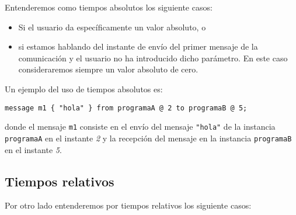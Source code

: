 Entenderemos como tiempos absolutos los siguiente casos:
\begin{itemize}
\item Si el usuario da específicamente un valor absoluto, o
\item si estamos hablando del instante de envío del primer mensaje de
  la comunicación y el usuario no ha introducido dicho parámetro. En
  este caso consideraremos siempre un valor absoluto de cero.
\end{itemize}

Un ejemplo del uso de tiempos absolutos es:

\begin{lstlisting}
message m1 { "hola" } from programaA @ 2 to programaB @ 5;
\end{lstlisting}

donde el mensaje \lstinline{m1} consiste en el envío del mensaje
\lstinline{"hola"} de la instancia \lstinline{programaA} en el
instante \textit{2} y la recepción del mensaje en la instancia
\lstinline{programaB} en el instante \textit{5}.

\subsection{Tiempos relativos}

Por otro lado entenderemos por tiempos relativos los siguiente casos:


